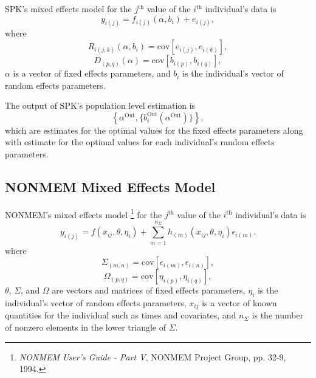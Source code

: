 \documentclass{article}
\begin{document}
SPK's mixed effects model for the $j^{\mbox{th}}$ value of the
$i^{\mbox{th}}$ individual's data is 
  \begin{equation}
    y_{i(j)} = f_{i(j)}(\alpha, b_i) + e_{i(j)} ,
  \end{equation}
where
  \begin{equation}
    R_{i(j,k)}(\alpha, b_i) = \mbox{cov}[e_{i(j)},e_{i(k)}] ,
  \end{equation}
  \begin{equation}
    D_{(p,q)}(\alpha) = \mbox{cov}[b_{i(p)},b_{i(q)}] ,
  \end{equation}
$\alpha$ is a vector of fixed effects parameters, 
and $b_i$ is the individual's vector of random effects parameters.

The output of SPK's population level estimation is
  \begin{equation}
    \left\{ \alpha^{\mbox{Out}}, 
      \{ b_i^{\mbox{Out}} ( \alpha^{\mbox{Out}} ) \} \right\} ,
  \end{equation}
which are estimates for the optimal values for the fixed 
effects parameters along with estimate for the optimal values
for each individual's random effects parameters.


\subsection{NONMEM Mixed Effects Model}

NONMEM's mixed effects model 
\footnote{
  {\em NONMEM User's Guide - Part V}, NONMEM Project Group, 
  pp. 32-9, 1994.
} 
for the $j^{\mbox{th}}$ value of the $i^{\mbox{th}}$ individual's data is 
  \begin{equation}
    y_{i(j)} = f(x_{ij}, \theta, \eta_i) + 
      \sum_{m=1}^{n_{\Sigma}} h_{(m)}(x_{ij}, \theta, \eta_i) \epsilon_{i(m)} .
  \end{equation}
where
  \begin{equation}
    \Sigma_{(m,n)} = \mbox{cov}[\epsilon_{i(m)},\epsilon_{i(n)}] ,
  \end{equation}
  \begin{equation}
    \Omega_{(p,q)} = \mbox{cov}[\eta_{i(p)},\eta_{i(q)}] ,
  \end{equation}
$\theta$, $\Sigma$, and $\Omega$ are vectors and matrices of fixed effects parameters,
$\eta_i$ is the individual's vector of random effects parameters,
$x_{ij}$ is a vector of known quantities for the individual
such as times and covariates,
and $n_{\Sigma}$ is the number of nonzero elements in the lower 
triangle of $\Sigma$.
\end{document}
